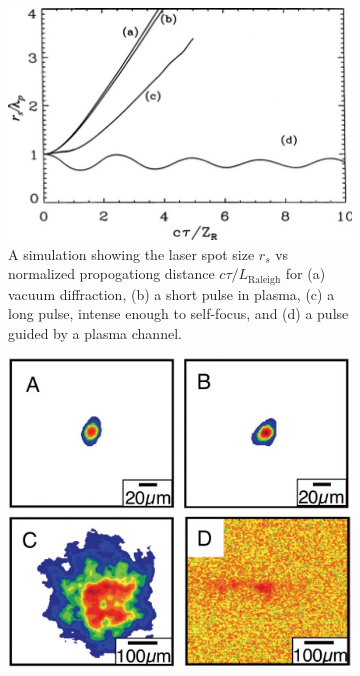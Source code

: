 \documentclass[12pt,letter]{article}
\begin{document}
\begin{figure}
\centering
\begin{singlespace*}
\begin{subfigure}[t]{.5\textwidth}
    \includegraphics[width=\textwidth]{../figures/plasmachannel.pdf}
    \caption{\small A simulation showing the laser spot size $r_s$ vs normalized
        propogationg distance $c\tau/L_\textrm{Raleigh}$ for (a) vacuum
        diffraction, (b) a short pulse in plasma, (c) a long pulse, intense
        enough to self-focus, and (d) a pulse guided by a plasma
    channel.\cite{sprangle1992propagation}}
\end{subfigure}
\hfill
\begin{subfigure}[t]{.45\textwidth}
    \includegraphics[width=\textwidth]{../figures/plaschan1.pdf}

\end{subfigure}
\end{singlespace*}
\end{figure}
\end{document}
